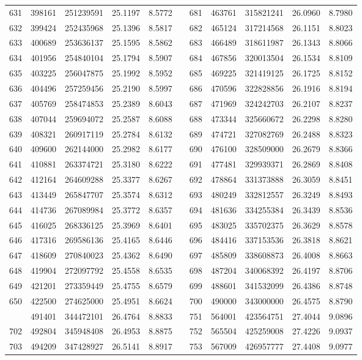 \begin{longtable}{rrrrrrrrrrr}
631&398161&251239591&25.1197&8.5772&&681&463761&315821241&26.0960&8.7980\\
632&399424&252435968&25.1396&8.5817&&682&465124&317214568&26.1151&8.8023\\
633&400689&253636137&25.1595&8.5862&&683&466489&318611987&26.1343&8.8066\\
634&401956&254840104&25.1794&8.5907&&684&467856&320013504&26.1534&8.8109\\
635&403225&256047875&25.1992&8.5952&&685&469225&321419125&26.1725&8.8152\\
636&404496&257259456&25.2190&8.5997&&686&470596&322828856&26.1916&8.8194\\
637&405769&258474853&25.2389&8.6043&&687&471969&324242703&26.2107&8.8237\\
638&407044&259694072&25.2587&8.6088&&688&473344&325660672&26.2298&8.8280\\
639&408321&260917119&25.2784&8.6132&&689&474721&327082769&26.2488&8.8323\\
640&409600&262144000&25.2982&8.6177&&690&476100&328509000&26.2679&8.8366\\
641&410881&263374721&25.3180&8.6222&&691&477481&329939371&26.2869&8.8408\\
642&412164&264609288&25.3377&8.6267&&692&478864&331373888&26.3059&8.8451\\
643&413449&265847707&25.3574&8.6312&&693&480249&332812557&26.3249&8.8493\\
644&414736&267089984&25.3772&8.6357&&694&481636&334255384&26.3439&8.8536\\
645&416025&268336125&25.3969&8.6401&&695&483025&335702375&26.3629&8.8578\\
646&417316&269586136&25.4165&8.6446&&696&484416&337153536&26.3818&8.8621\\
647&418609&270840023&25.4362&8.6490&&697&485809&338608873&26.4008&8.8663\\
648&419904&272097792&25.4558&8.6535&&698&487204&340068392&26.4197&8.8706\\
649&421201&273359449&25.4755&8.6579&&699&488601&341532099&26.4386&8.8748\\
650&422500&274625000&25.4951&8.6624&&700&490000&343000000&26.4575&8.8790\\
\newpage
701&491401&344472101&26.4764&8.8833&&751&564001&423564751&27.4044&9.0896\\
702&492804&345948408&26.4953&8.8875&&752&565504&425259008&27.4226&9.0937\\
703&494209&347428927&26.5141&8.8917&&753&567009&426957777&27.4408&9.0977\\

\end{longtable}
